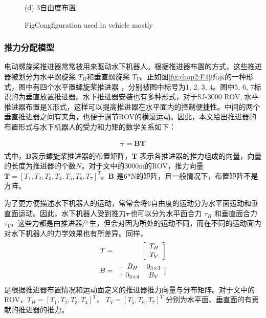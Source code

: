 \begin{figure}
\begin{minipage}{0.48\linewidth}
  \centerline{(d) 3自由度布置}
\end{minipage}
\label{fig:chap2:F8}
 {Fig}{Congfiguration used in vehicle mostly\cite{ardusub}}
\end{figure}

\subsubsection{推力分配模型 }
电动螺旋桨推进器常常被用来驱动水下机器人。根据推进器布置的方式，这些推进器被划分为水平螺旋桨  $T_H$和垂直螺旋桨 $T_V$。正如图\ref{fig:chap2:F4}所示的一种形式，图中有四个水平置螺旋桨推进器 ，分别被图中标号为1, 2, 3, 4。图中5, 6, 7标识的为垂直放置推进器。水下推进器安装也有多种形式，对于SJ-3000 ROV, 水平推进器布置是X形式，这样可以提高推进器在水平面内的控制便捷性。中间的两个垂直推进器之间有夹角，也便于调节ROV的横滚运动。因此，本文给出推进器的布置形式与水下机器人的受力和力矩的数学关系如下\cite{dos2016bank}：

\begin{equation}
\label{eq:chap2:thrustconfigure_1}
  \begin{array}{l}
   {\bm \tau} = \bm{BT} \\
  \end{array}
\end{equation}
式中，$\bm{B}$表示螺旋桨推进器的布置矩阵，$\bm{T}$ 表示各推进器的推力组成的向量，向量的长度为推进器的个数$N$。对于文中的3000m的ROV，推力向量$\bm{T} = [T_1,T_2,T_3,T_4,T_5,T_6,T_7]^T$。$\bm{B}$ 是6*N的矩阵，且一般情况下，布置矩阵不是方阵。

为了更方便描述水下机器人的运动，常常会将6自由度的运动分为水平面运动和垂直面运动。因此，水下机器人受到推力$\bm \tau$也可以分为水平面合力 $\tau_H$ 和垂直面合力 $\tau_V$，这些力都是由推进器产生，但会对因为所处的运动不同，而在不同的运动面内对水下机器人的力学效果也有所差异。同样，\\
\begin{eqnarray}
\label{eq:chap2:BvBh}
\centering
T &=& \left[ {\begin{array}{*{20}{c}}
   {{T_H}}  \\
   {{T_V}}  \\
\end{array}} \right]\\
B &=& [\begin{array}{*{20}{c}}
    {{B_H}} & {0_{3\times3}}  \\
    {0_{3\times4}} & {{B_V}}  \\
\end{array}]
\end{eqnarray}
是根据推进器布置情况和运动面定义的推进器推力向量与分布矩阵。对于文中的ROV，$T_H = [T_1, T_2, T_3, T_4]^T$， $T_V = [T_5,T_6,T_7]^T$ 分别为水平面、垂直面的有贡献的推进器的推力。

